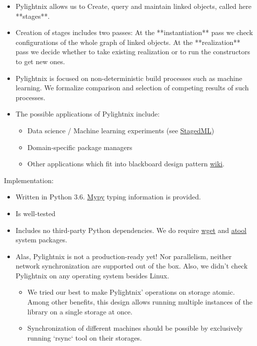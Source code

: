 \documentclass{article}
\begin{document}
\begin{itemize}
  \item Pylightnix allows us to Create, query and maintain linked objects,
    called here **stages**.
  \item Creation of stages includes two passes: At the **instantiation** pass we
    check configurations of the whole graph of linked objects. At the
    **realization** pass we decide whether to take existing realization or to
    run the constructors to get new ones.
  \item Pylightnix is focused on non-deterministic build processes such as
    machine learning. We formalize comparison and selection of competing results
    of such processes.
  \item The possible applications of Pylightnix include:
    \begin{itemize}
      \item Data science / Machine learning experiments (see
        \href{https://github.com/stagedml/stagedml}{StagedML})
      \item Domain-specific package managers
      \item Other applications which fit into blackboard design pattern
        \href{https://en.wikipedia.org/wiki/Blackboard_design_pattern}{wiki}.
    \end{itemize}
\end{itemize}

Implementation:

\begin{itemize}
  \item Written in Python 3.6. \href{http://mypy-lang.org/}{Mypy} typing
    information is provided.
  \item Is well-tested
  \item Includes no third-party Python dependencies. We do require
    \href{https://www.gnu.org/software/wget/}{wget} and
    \href{https://www.nongnu.org/atool/}{atool} system packages.
  \item Alas, Pylightnix is not a production-ready yet! Nor parallelism, neither
    network synchronization are supported out of the box. Also, we didn't check
    Pylightnix on any operating system besides Linux.
    \begin{itemize}
      \item We tried our best to make Pylightnix' operations on storage atomic.
        Among other benefits, this design allows running multiple instances of
        the library on a single storage at once.
      \item Synchronization of different machines should be possible by
        exclusively running `rsync` tool on their storages.
    \end{itemize}
\end{itemize}
\end{document}
